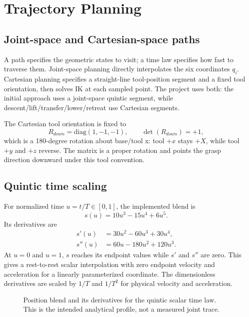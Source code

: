 \chapter{Trajectory Planning}
\label{ch:trajectory}

\section{Joint-space and Cartesian-space paths}
A path specifies the geometric states to visit; a time law specifies how fast
to traverse them. Joint-space planning directly interpolates the six
coordinates $q_i$. Cartesian planning specifies a straight-line tool-position
segment and a fixed tool orientation, then solves IK at each sampled point.
The project uses both: the initial approach uses a joint-space quintic
segment, while descent/lift/transfer/lower/retreat use Cartesian segments.

The Cartesian tool orientation is fixed to
\begin{equation}
 R_{down}=\mathrm{diag}(1,-1,-1),\qquad \det(R_{down})=+1,
\end{equation}
which is a 180-degree rotation about base/tool x: tool $+x$ stays $+X$, while
tool $+y$ and $+z$ reverse. The matrix is a proper rotation and points the
grasp direction downward under this tool convention.

\section{Quintic time scaling}
For normalized time $u=t/T\in[0,1]$, the implemented blend is
\begin{equation}
 s(u)=10u^3-15u^4+6u^5.
 \label{eq:quintic}
\end{equation}
Its derivatives are
\begin{align}
 s'(u)&=30u^2-60u^3+30u^4,\\
 s''(u)&=60u-180u^2+120u^3.
\end{align}
At $u=0$ and $u=1$, $s$ reaches its endpoint values while $s'$ and $s''$ are
zero. This gives a rest-to-rest scalar interpolation with zero endpoint
velocity and acceleration for a linearly parameterized coordinate. The
dimensionless derivatives are scaled by $1/T$ and $1/T^2$ for physical
velocity and acceleration.

\begin{figure}[htbp]
\centering
\caption{Position blend and its derivatives for the quintic scalar time law.
This is the intended analytical profile, not a measured joint trace.}
\label{fig:quintic}
\end{figure}

